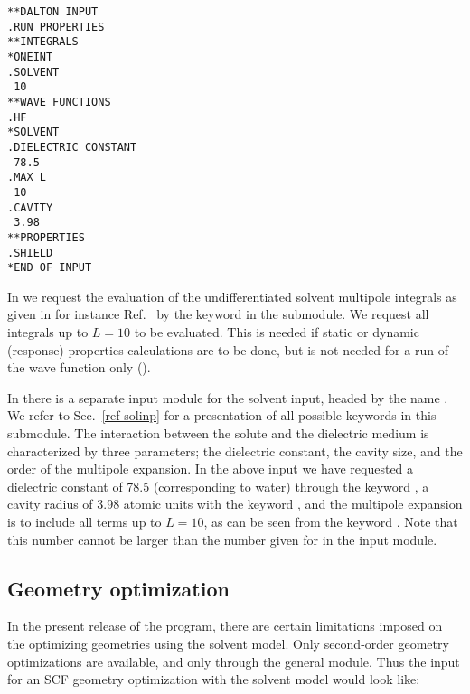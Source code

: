\begin{verbatim}
**DALTON INPUT
.RUN PROPERTIES
**INTEGRALS
*ONEINT
.SOLVENT
 10
**WAVE FUNCTIONS
.HF
*SOLVENT
.DIELECTRIC CONSTANT
 78.5
.MAX L
 10
.CAVITY
 3.98
**PROPERTIES
.SHIELD
*END OF INPUT
\end{verbatim}

In  we request the evaluation of the undifferentiated solvent
multipole integrals as given in for instance
Ref.~\cite{kvmhahjajthjcp89} by the keyword  in the
 submodule. We request all
integrals up to $L=10$ to be evaluated. This is needed if static or
dynamic (response) properties
calculations are to be done, but is not needed for a run of the
wave function only ().

In  there is a separate input module for the
solvent input,
headed by the name . We refer to Sec.~\ref{ref-solinp}
for a presentation of all possible keywords in this submodule. The
interaction between the solute and the dielectric
medium is
characterized by three parameters; the dielectric
constant, the cavity
size, and the order of the multipole
expansion. In the above input we have
requested a dielectric constant of 78.5 (corresponding to water)
through the keyword , a cavity radius of 3.98 atomic
units with the keyword , and the multipole expansion is to
include all terms up to $L=10$, as can be seen from the keyword
. Note that this number cannot be larger than the number given for
 in the  input module.

\subsection{Geometry optimization}\label{sec:solventgeoopt}

In the present release of the {\dalton} program, there are certain
limitations imposed on the optimizing geometries using the solvent
model. Only second-order geometry optimizations
are available, and only through the general  module. 
Thus the input for an SCF geometry optimization with the solvent model
would look like:

